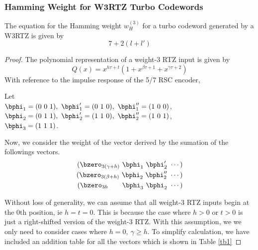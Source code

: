 \subsubsection{Hamming Weight for W3RTZ Turbo Codewords }
The equation for the Hamming weight $w^{(3)}_H$ for a turbo codeword generated by a W3RTZ is given by
\begin{equation}
7+2(l+l')
\label{RTZInputs-2}
\end{equation}
\begin{proof}
The polynomial representation of a weight-$3$ RTZ input is given by $$Q(x) =x^{h\tau+t}(1+x^{\beta \tau +1}+x^{\gamma \tau +2})$$
With reference to the impulse response of the 5/7  RSC encoder, 

Let \\$\bphi_1=(0~0~1),~\bphi'_1=(0~1~0),~\bphi''_1=(1~0~0)$, \\
$\bphi_2=(0~1~1),~\bphi'_2=(1~1~0),~\bphi''_2=(1~0~1)$, \\
$\bphi_3=(1~1~1)$. 

Now, we consider the weight of the vector derived by the sumation of the followings vectors.
\begin{eqnarray*}
(\bzero_{3(\gamma+h)}~\bphi_1~\bphi'_2~\cdots)\cr
(\bzero_{3(\beta+h)}~\bphi_2~\bphi''_2~\cdots)\cr
(\bzero_{3 h}~~~~~~\bphi_3~\bphi_2~\cdots)
\end{eqnarray*}

Without loss of generality, we can assume that all weight-$3$ RTZ inputs begin at the $0$th position, ie $h=t=0$. This is because the case where $h>0$ or $t>0$ is just a right-shifted version of the weight-$3$ RTZ. With this assumption, we we only need to consider cases where $h= 0,~\gamma \geq h$.
To simplify calculation, we have included an addition table for all the vectors which is shown in Table \ref{tb1}


\end{proof}
